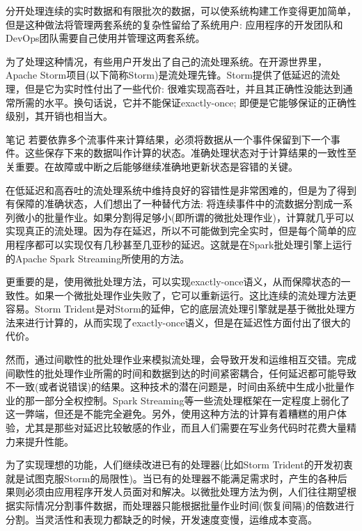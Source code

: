 \documentclass[oneside]{ctexbook}
\begin{document}
分开处理连续的实时数据和有限批次的数据，可以使系统构建工作变得更加简单，但是这种做法将管理两套系统的复杂性留给了系统用户: 应用程序的开发团队和DevOps团队需要自己使用并管理这两套系统。

为了处理这种情况，有些用户开发出了自己的流处理系统。在开源世界里，Apache Storm项目(以下简称Storm)是流处理先锋。Storm提供了低延迟的流处理，但是它为实时性付出了一些代价: 很难实现高吞吐，并且其正确性没能达到通常所需的水平。换句话说，它并不能保证exactly-once; 即便是它能够保证的正确性级别，其开销也相当大。

\begin{bclogo}[logo=\bcinfo, couleurBarre=orange, noborder=true, couleur=white]{笔记}
若要依靠多个流事件来计算结果，必须将数据从一个事件保留到下一个事件。这些保存下来的数据叫作计算的状态。准确处理状态对于计算结果的一致性至关重要。在故障或中断之后能够继续准确地更新状态是容错的关键。
\end{bclogo}

在低延迟和高吞吐的流处理系统中维持良好的容错性是非常困难的，但是为了得到有保障的准确状态，人们想出了一种替代方法: 将连续事件中的流数据分割成一系列微小的批量作业。如果分割得足够小(即所谓的微批处理作业)，计算就几乎可以实现真正的流处理。因为存在延迟，所以不可能做到完全实时，但是每个简单的应用程序都可以实现仅有几秒甚至几亚秒的延迟。这就是在Spark批处理引擎上运行的Apache Spark Streaming所使用的方法。

更重要的是，使用微批处理方法，可以实现exactly-once语义，从而保障状态的一致性。如果一个微批处理作业失败了，它可以重新运行。这比连续的流处理方法更容易。Storm Trident是对Storm的延伸，它的底层流处理引擎就是基于微批处理方法来进行计算的，从而实现了exactly-once语义，但是在延迟性方面付出了很大的代价。

然而，通过间歇性的批处理作业来模拟流处理，会导致开发和运维相互交错。完成间歇性的批处理作业所需的时间和数据到达的时间紧密耦合，任何延迟都可能导致不一致(或者说错误)的结果。这种技术的潜在问题是，时间由系统中生成小批量作业的那一部分全权控制。Spark Streaming等一些流处理框架在一定程度上弱化了这一弊端，但还是不能完全避免。另外，使用这种方法的计算有着糟糕的用户体验，尤其是那些对延迟比较敏感的作业，而且人们需要在写业务代码时花费大量精力来提升性能。

为了实现理想的功能，人们继续改进已有的处理器(比如Storm Trident的开发初衷就是试图克服Storm的局限性)。当已有的处理器不能满足需求时，产生的各种后果则必须由应用程序开发人员面对和解决。以微批处理方法为例，人们往往期望根据实际情况分割事件数据，而处理器只能根据批量作业时间(恢复间隔)的倍数进行分割。当灵活性和表现力都缺乏的时候，开发速度变慢，运维成本变高。
\end{document}
